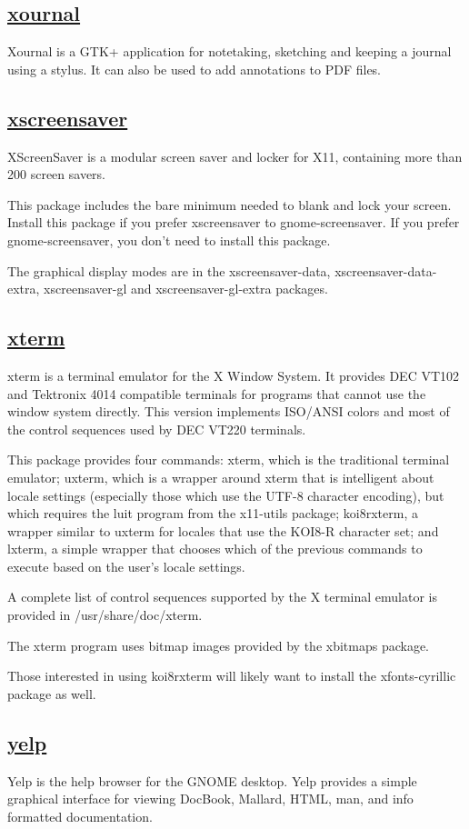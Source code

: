 \subsection{\href{http://xournal.sourceforge.net/}{xournal}}

 Xournal is a GTK+ application for notetaking, sketching and
 keeping a journal using a stylus. It can also be used to
 add annotations to PDF files.

\subsection{\href{http://www.jwz.org/xscreensaver/}{xscreensaver}}

 XScreenSaver is a modular screen saver and locker for X11,
 containing more than 200 screen savers.
 
 This package includes the bare minimum needed to blank and lock
 your screen. Install this package if you prefer xscreensaver to
 gnome-screensaver. If you prefer gnome-screensaver, you don't
 need to install this package.
 
 The graphical display modes are in the xscreensaver-data,
 xscreensaver-data-extra, xscreensaver-gl and xscreensaver-gl-extra
 packages.

\subsection{\href{http://invisible-island.net/xterm/xterm.html}{xterm}}

 xterm is a terminal emulator for the X Window System.  It provides DEC VT102
 and Tektronix 4014 compatible terminals for programs that cannot use the
 window system directly.  This version implements ISO/ANSI colors and most of
 the control sequences used by DEC VT220 terminals.
 
 This package provides four commands: xterm, which is the traditional
 terminal emulator; uxterm, which is a wrapper around xterm that is
 intelligent about locale settings (especially those which use the UTF-8
 character encoding), but which requires the luit program from the x11-utils
 package; koi8rxterm, a wrapper similar to uxterm for locales that use the
 KOI8-R character set; and lxterm, a simple wrapper that chooses which of the
 previous commands to execute based on the user's locale settings.
 
 A complete list of control sequences supported by the X terminal emulator
 is provided in /usr/share/doc/xterm.
 
 The xterm program uses bitmap images provided by the xbitmaps package.
 
 Those interested in using koi8rxterm will likely want to install the
 xfonts-cyrillic package as well.

\subsection{\href{https://wiki.gnome.org/Apps/Yelp}{yelp}}

 Yelp is the help browser for the GNOME desktop.  Yelp provides a simple
 graphical interface for viewing DocBook, Mallard, HTML, man, and info
 formatted documentation.

